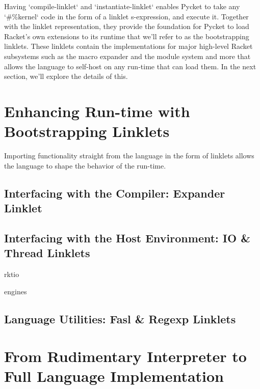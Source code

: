 		\begin{paragraph-here}%
			Having `compile-linklet` and `instantiate-linklet` enables Pycket to take any `\#\%kernel` code in the form of a linklet s-expression, and execute it. Together with the linklet representation, they provide the foundation for Pycket to load Racket's own extensions to its runtime that we'll refer to as the bootstrapping linklets. These linklets contain the implementations for major high-level Racket subsystems such as the macro expander and the module system and more that allows the language to self-host on any run-time that can load them. In the next section, we'll explore the details of this.
		\end{paragraph-here}


	\section[\texorpdfstring{Enhancing Run-time with Bootstrapping Linklets}{Bootstrapping Linklets}]{Enhancing Run-time with Bootstrapping Linklets}
		\begin{mainpoint}
			Importing functionality straight from the language in the form of linklets allows the language to shape the behavior of the run-time.
		\end{mainpoint}

		\subsection{Interfacing with the Compiler: Expander Linklet}

		\subsection{Interfacing with the Host Environment: IO \& Thread Linklets}
			\begin{todo}[TODO]
				rktio
			\end{todo}
			\begin{todo}[TODO]
				engines
			\end{todo}
		\subsection{Language Utilities: Fasl \& Regexp Linklets}

	\section[\texorpdfstring{From Rudimentary Interpreter to Full Language Implementation}{Pycket Elevated}]{From Rudimentary Interpreter to Full Language Implementation}


